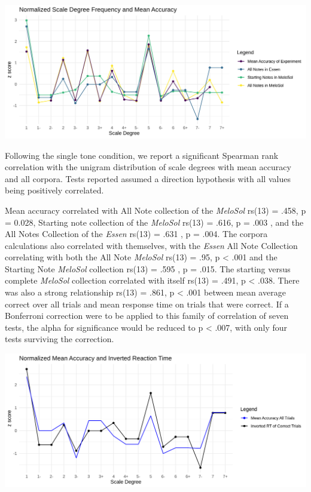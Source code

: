\documentclass[english,man,floatsintext]{apa6}
\begin{document}
\includegraphics{../figures/mean_rt_corpus.png}

Following the single tone condition, we report a significant Spearman rank correlation with the unigram distribution of scale degrees with mean accuracy and all corpora.
Tests reported assumed a direction hypothesis with all values being positively correlated.

Mean accuracy correlated with All Note collection of the \emph{MeloSol} rs(13) = .458, p = 0.028, Starting note collection of the \emph{MeloSol} rs(13) = .616, p = .003 , and the All Notes Collection of the \emph{Essen} rs(13) = .631 , p = .004.
The corpora calculations also correlated with themselves, with the \emph{Essen} All Note Collection correlating with both the All Note \emph{MeloSol} rs(13) = .95, p \textless{} .001 and the Starting Note \emph{MeloSol} collection rs(13) = .595 , p = .015.
The starting versus complete \emph{MeloSol} collection correlated with itself rs(13) = .491, p \textless{} .038.
There was also a strong relationship rs(13) = .861, p \textless{} .001 between mean average correct over all trials and mean response time on trials that were correct.
If a Bonferroni correction were to be applied to this family of correlation of seven tests, the alpha for significance would be reduced to p \textless{} .007, with only four tests surviving the correction.

\includegraphics{../figures/mean_rt_corpus_behavioral.png}
\end{document}
